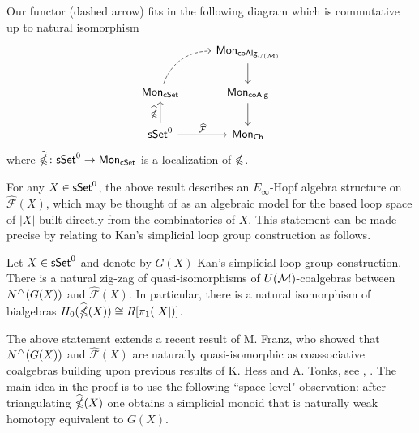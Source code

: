 \begin{theorem}\label{t:2nd main thm in the intro}
    Our functor (dashed arrow) fits in the following diagram which is commutative up to natural isomorphism
    \begin{equation*}
    \begin{tikzcd}
    & \Mon_{\coAlg_{U(\M)}} \arrow[d] \\
    \Mon_{\cSet} \arrow[ru, dashed, out=70, in=180] & \Mon_{\coAlg} \arrow[d] \\
    \sSet^0 \arrow[r, "\widehat{\mathcal{F}}"] \arrow[u, "\widehat \gcobar"] & \Mon_{\Ch}
    \end{tikzcd}
    \end{equation*}
    where $\widehat{\mathbb{\Omega}} \colon \mathsf{sSet}^0 \to \mathsf{Mon}_{\mathsf{cSet}}$ is a localization of $\mathbb{\Omega}$.
    
\end{theorem}

For any $X \in \mathsf{sSet}^0$, the above result describes an  $E_{\infty}$-Hopf algebra structure on $\widehat{\mathcal{F}}(X)$, which may be thought of as an algebraic model for the based loop space of $|X|$ built directly from the combinatorics of $X$. This statement can be made precise by relating to Kan's simplicial loop group construction as follows.

\begin{theorem} \label{t:3rd main thm in the intro}
Let $X \in \mathsf{sSet}^0$ and denote by $G(X)$ Kan's simplicial loop group construction. There is a natural zig-zag of quasi-isomorphisms of $U(\mathcal{M})$-coalgebras between $N^{\triangle}(G(X))$ and $\widehat{\mathcal{F}}(X)$. In particular, there is a natural isomorphism of bialgebras $H_0(\widehat{\mathbb{\Omega}}(X)) \cong R[\pi_1(|X|)]$.
\end{theorem}
The above statement extends a recent result of M. Franz, who showed that $N^{\triangle}(G(X))$ and $\widehat{\mathcal{F}}(X)$ are naturally quasi-isomorphic as coassociative coalgebras building upon previous results of K. Hess and A. Tonks, see \cite{franz}, \cite{Hess-Tonks}. The main idea in the proof is to use the following ``space-level" observation: after triangulating $\widehat{\mathbb{\Omega}}({X})$ one obtains a simplicial monoid that is naturally weak homotopy equivalent to $G(X).$ 




